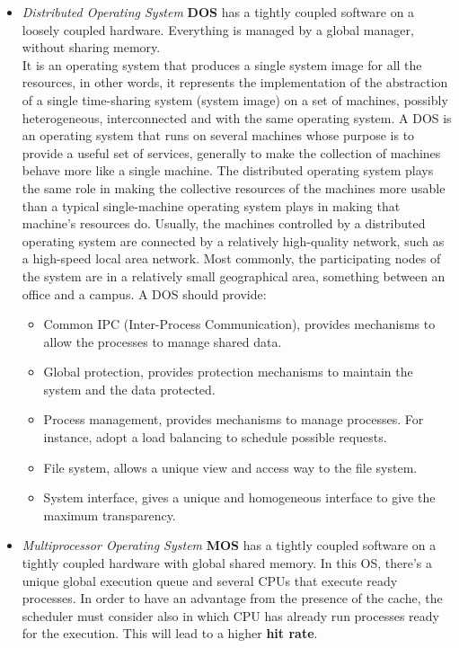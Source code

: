 \begin{itemize}
    \item \textit{Distributed Operating System} \textbf{DOS} has a tightly coupled software on a loosely coupled hardware. Everything is managed by a global manager, without sharing memory.\\
    It is an operating system that produces a single system image for all the resources, in other words, it represents the implementation of the abstraction of a single time-sharing system (system image) on a set of machines, possibly heterogeneous, interconnected and with the same operating system. 
    A DOS is an operating system that runs on several machines whose purpose is to provide a useful set of services, generally to make the collection of machines behave more like a single machine. The distributed operating system plays the same role in making the collective resources of the machines more usable than a typical single-machine operating system plays in making that machine's resources do. Usually, the machines controlled by a distributed operating system are connected by a relatively high-quality network, such as a high-speed local area network. Most commonly, the participating nodes of the system are in a relatively small geographical area, something between an office and a campus.
    A DOS should provide:
    \begin{itemize}
        \item Common IPC (Inter-Process Communication), provides mechanisms to allow the processes to manage shared data. 
        \item Global protection, provides protection mechanisms to maintain the system and the data protected.
        \item Process management, provides mechanisms to manage processes. For instance, adopt a load balancing to schedule possible requests.
        \item File system, allows a unique view and access way to the file system.
        \item System interface, gives a unique and homogeneous interface to give the maximum transparency.  
    \end{itemize}
    \item \textit{Multiprocessor Operating System} \textbf{MOS} has a tightly coupled software on a tightly coupled hardware with global shared memory. In this OS, there’s a unique global execution queue and several CPUs that execute ready processes. In order to have an advantage from the presence of the cache, the scheduler must consider also in which CPU has already run processes ready for the execution. This will lead to a higher \textbf{hit rate}.
\end{itemize}